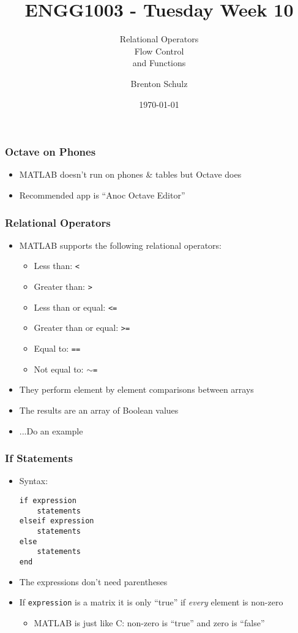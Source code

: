 \documentclass[14pt]{beamer}
\title{ENGG1003 - Tuesday Week 10}
\subtitle{Relational Operators\\Flow Control\\and Functions}
\author{Brenton Schulz}
\institute{University of Newcastle}
\date{\today}
\begin{document}
\titlepage

\begin{frame}
\frametitle{Octave on Phones}
\begin{itemize}
\item MATLAB doesn't run on phones \& tables but Octave does
\item Recommended app is ``Anoc Octave Editor''
\end{itemize}
\end{frame}

\begin{frame}
\frametitle{Relational Operators}
\begin{itemize}
\item MATLAB supports the following relational operators:
	\begin{itemize}
		\item Less than: \texttt{<}
		\item Greater than: \texttt{>}
		\item Less than or equal: \texttt{<=}
		\item Greater than or equal: \texttt{>=}
		\item Equal to: \texttt{==}
		\item Not equal to: \texttt{$\sim$=}
	\end{itemize}
\item They perform element by element comparisons between arrays
\item The results are an array of Boolean values
\item ...Do an example
\end{itemize}
\end{frame}

\begin{frame}[fragile]
\frametitle{If Statements}
\begin{itemize}
\item Syntax:
\begin{lstlisting}[style=pseudo]
if expression
    statements
elseif expression
    statements
else
    statements
end
\end{lstlisting}
\item The expressions don't need parentheses
\item If \texttt{expression} is a matrix it is only ``true'' if \textit{every} element is non-zero
	\begin{itemize}
		\item MATLAB is just like C: non-zero is ``true'' and zero is ``false''
	\end{itemize}
\end{itemize}
\end{frame}
\end{document}
